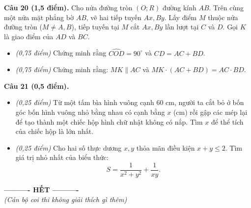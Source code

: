 \documentclass[11pt,a4paper]{article}
\begin{document}
\vspace{2mm}
\textbf{Câu 20 (1,5 điểm).} Cho nửa đường tròn $(O; R)$ đường kính $AB$. Trên cùng một nửa mặt phẳng bờ $AB$, vẽ hai tiếp tuyến $Ax, By$. Lấy điểm $M$ thuộc nửa đường tròn ($M \ne A, B$), tiếp tuyến tại $M$ cắt $Ax, By$ lần lượt tại $C$ và $D$. Gọi $K$ là giao điểm của $AD$ và $BC$.
\begin{itemize}
  \item[a)] \textit{(0,75 điểm)} Chứng minh rằng $\widehat{COD} = 90^\circ$ và $CD = AC + BD$.
  \item[b)] \textit{(0,75 điểm)} Chứng minh rằng: $MK \parallel AC$ và $MK \cdot (AC + BD) = AC \cdot BD$.
\end{itemize}

\vspace{2mm}
\textbf{Câu 21 (0,5 điểm).}
\begin{itemize}
  \item[a)] \textit{(0,25 điểm)} Từ một tấm bìa hình vuông cạnh $60\text{ cm}$, người ta cắt bỏ ở bốn góc bốn hình vuông nhỏ bằng nhau có cạnh bằng $x$ (cm) rồi gập các mép lại để tạo thành một chiếc hộp hình chữ nhật không có nắp. Tìm $x$ để thể tích của chiếc hộp là lớn nhất.
  \item[b)] \textit{(0,25 điểm)} Cho hai số thực dương $x, y$ thỏa mãn điều kiện $x + y \le 2$. Tìm giá trị nhỏ nhất của biểu thức:
  \[
  S = \dfrac{1}{x^2 + y^2} + \dfrac{1}{xy}.
  \]
\end{itemize}

\vspace{4mm}
\begin{center}
\textbf{---------- HẾT ----------}\\
\textit{(Cán bộ coi thi không giải thích gì thêm)}
\end{center}
\end{document}
